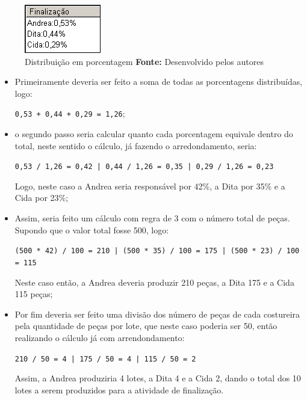 \begin{figure}[h!]
	\centerline{\includegraphics[scale=1.0]{./imagens/distribuicao_porcentagem.png}}
	\caption[Distribuição em porcentagem]
	{Distribuição em porcentagem \textbf{Fonte:} Desenvolvido pelos autores}
	\label{fig:exemplo1}
\end{figure}

\begin{itemize}
	\item Primeiramente deveria ser feito a soma de todas as porcentagens distribuídas, logo: 
	\par \texttt{0,53 + 0,44 + 0,29 = 1,26};
	
	\item o segundo passo seria calcular quanto cada porcentagem equivale dentro do total, neste 
	sentido o cálculo, já fazendo o arredondamento, seria: 
	\par \texttt{0,53 / 1,26 = 0,42 | 0,44 / 1,26 = 0,35 | 0,29 / 1,26 = 0,23}
	\par Logo, neste caso a Andrea seria responsável por 42\%, a Dita por 35\% e a Cida por 23\%;
	
	\item Assim, seria feito um cálculo com regra de 3 com o número total de peças. Supondo que o 
	 valor total fosse 500, logo:
	
	\par \texttt{(500 * 42) / 100 = 210 | (500 * 35) / 100 = 175 | (500 * 23) / 100 = 115}
	
	\par Neste caso então, a Andrea deveria produzir 210 peças, a Dita 175 e a Cida 115 peças;
	
	\item Por fim deveria ser feito uma divisão dos número de peças de cada costureira pela quantidade
     de peças por lote, que neste caso poderia ser 50, então realizando o cálculo já com arrendondamento:
     \par \texttt{210 / 50 = 4 | 175 / 50 = 4 | 115 / 50 = 2}
     
     \par Assim, a Andrea produziria 4 lotes, a Dita 4 e a Cida 2, dando o total
     dos 10 lotes a serem produzidos para a atividade de finalização.
	
\end{itemize}
 
